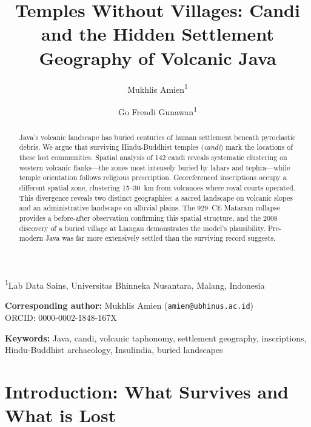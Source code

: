 \documentclass[12pt,a4paper]{article}
\title{Temples Without Villages: Candi and the Hidden Settlement Geography of Volcanic Java}
\author{Mukhlis Amien\textsuperscript{1} \and Go Frendi Gunawan\textsuperscript{1}}
\date{}
\begin{document}
\maketitle

\noindent\textsuperscript{1}Lab Data Sains, Universitas Bhinneka Nusantara, Malang, Indonesia

\vspace{0.5em}
\noindent\textbf{Corresponding author:} Mukhlis Amien (\texttt{amien@ubhinus.ac.id})\\
\noindent ORCID: 0000-0002-1848-167X

\begin{abstract}
Java's volcanic landscape has buried centuries of human settlement beneath pyroclastic debris.
We argue that surviving Hindu-Buddhist temples (\emph{candi}) mark the locations of these lost communities.
Spatial analysis of 142 candi reveals systematic clustering on western volcanic flanks---the zones most intensely buried by lahars and tephra---while temple orientation follows religious prescription.
Georeferenced inscriptions occupy a different spatial zone, clustering 15--30~km from volcanoes where royal courts operated.
This divergence reveals two distinct geographies: a sacred landscape on volcanic slopes and an administrative landscape on alluvial plains.
The 929~CE Mataram collapse provides a before-after observation confirming this spatial structure, and the 2008 discovery of a buried village at Liangan demonstrates the model's plausibility.
Pre-modern Java was far more extensively settled than the surviving record suggests.
\end{abstract}

\vspace{0.5em}
\noindent\textbf{Keywords:} Java, candi, volcanic taphonomy, settlement geography, inscriptions, Hindu-Buddhist archaeology, Insulindia, buried landscapes


\newpage

\section{Introduction: What Survives and What is Lost}
\end{document}
